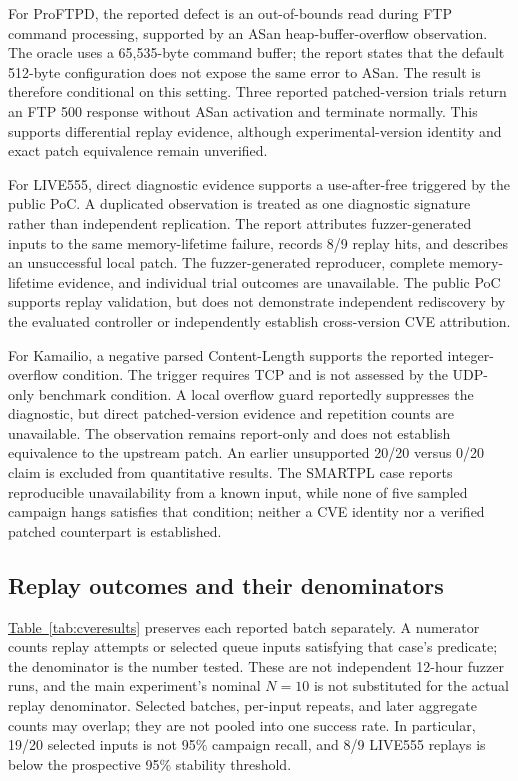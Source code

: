 \documentclass[final,5p,times,number]{elsarticle}
\newcommand{\namedref}[2]{\hyperref[#2]{#1~\ref*{#2}}}
\begin{document}
For ProFTPD, the reported defect is an out-of-bounds read during FTP command processing, supported by an ASan heap-buffer-overflow observation. The oracle uses a 65,535-byte command buffer; the report states that the default 512-byte configuration does not expose the same error to ASan. The result is therefore conditional on this setting. Three reported patched-version trials return an FTP 500 response without ASan activation and terminate normally. This supports differential replay evidence, although experimental-version identity and exact patch equivalence remain unverified.

For LIVE555, direct diagnostic evidence supports a use-after-free triggered by the public PoC. A duplicated observation is treated as one diagnostic signature rather than independent replication. The report attributes fuzzer-generated inputs to the same memory-lifetime failure, records 8/9 replay hits, and describes an unsuccessful local patch. The fuzzer-generated reproducer, complete memory-lifetime evidence, and individual trial outcomes are unavailable. The public PoC supports replay validation, but does not demonstrate independent rediscovery by the evaluated controller or independently establish cross-version CVE attribution.

For Kamailio, a negative parsed Content-Length supports the reported integer-overflow condition. The trigger requires TCP and is not assessed by the UDP-only benchmark condition. A local overflow guard reportedly suppresses the diagnostic, but direct patched-version evidence and repetition counts are unavailable. The observation remains report-only and does not establish equivalence to the upstream patch. An earlier unsupported 20/20 versus 0/20 claim is excluded from quantitative results. The SMARTPL case reports reproducible unavailability from a known input, while none of five sampled campaign hangs satisfies that condition; neither a CVE identity nor a verified patched counterpart is established.

\subsection{Replay outcomes and their denominators}
\namedref{Table}{tab:cveresults} preserves each reported batch separately. A numerator counts replay attempts or selected queue inputs satisfying that case's predicate; the denominator is the number tested. These are not independent 12-hour fuzzer runs, and the main experiment's nominal $N=10$ is not substituted for the actual replay denominator. Selected batches, per-input repeats, and later aggregate counts may overlap; they are not pooled into one success rate. In particular, 19/20 selected inputs is not 95\% campaign recall, and 8/9 LIVE555 replays is below the prospective 95\% stability threshold.
\end{document}
